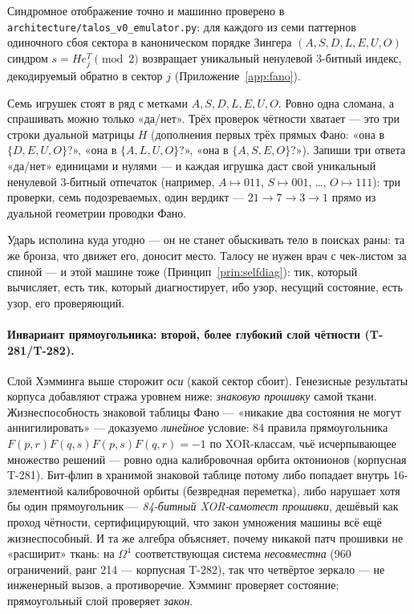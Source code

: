 Синдромное отображение точно и машинно проверено в
\texttt{architecture/talos\_v0\_emulator.py}: для каждого из семи паттернов
одиночного сбоя сектора в каноническом порядке Зингера $(A,S,D,L,E,U,O)$
синдром $s = He_j^T \pmod 2$ возвращает уникальный ненулевой $3$-битный индекс,
декодируемый обратно в сектор $j$ (Приложение~\ref{app:fano}).

\begin{zerobox}
Семь игрушек стоят в ряд с метками $A,S,D,L,E,U,O$. Ровно одна сломана, а
спрашивать можно только «да/нет». Трёх проверок чётности хватает --- это три
строки дуальной матрицы $H$ (дополнения первых трёх прямых Фано: «она в
$\{D,E,U,O\}$?», «она в $\{A,L,U,O\}$?», «она в $\{A,S,E,O\}$?»). Запиши три
ответа «да/нет» единицами и нулями --- и каждая игрушка даст свой уникальный
ненулевой $3$-битный отпечаток (например, $A\mapsto 011$, $S\mapsto 001$, \dots,
$O\mapsto 111$): три проверки, семь подозреваемых, один вердикт ---
$21\to 7\to 3\to 1$ прямо из дуальной геометрии проводки Фано.
\end{zerobox}

\begin{mythbox}
Ударь исполина куда угодно --- он не станет обыскивать тело в поисках раны:
та же бронза, что движет его, доносит место. Талосу не нужен врач с
чек-листом за спиной --- и этой машине тоже
(Принцип~\ref{prin:selfdiag}): тик, который вычисляет, есть тик, который
диагностирует, ибо узор, несущий состояние, есть узор, его проверяющий.
\end{mythbox}

\paragraph{Инвариант прямоугольника: второй, более глубокий слой чётности (T-281/T-282).}
Слой Хэмминга выше сторожит \emph{оси} (какой сектор сбоит). Генезисные
результаты корпуса добавляют стража уровнем ниже: \emph{знаковую прошивку}
самой ткани. Жизнеспособность знаковой таблицы Фано --- «никакие два состояния
не могут аннигилировать» --- доказуемо \emph{линейное} условие: 84 правила
прямоугольника $F(p,r)F(q,s)F(p,s)F(q,r) = -1$ по XOR-классам, чьё
исчерпывающее множество решений --- ровно одна калибровочная орбита октонионов
(корпусная T-281). Бит-флип в хранимой знаковой таблице потому либо попадает
внутрь 16-элементной калибровочной орбиты (безвредная переметка), либо
нарушает хотя бы один прямоугольник --- \emph{84-битный XOR-самотест
прошивки}, дешёвый как проход чётности, сертифицирующий, что закон умножения
машины всё ещё жизнеспособный. И та же алгебра объясняет, почему никакой патч
прошивки не «расширит» ткань: на $\Omega^4$ соответствующая система
\emph{несовместна} (960 ограничений, ранг 214 --- корпусная T-282), так что
четвёртое зеркало --- не инженерный вызов, а противоречие. Хэмминг проверяет
состояние; прямоугольный слой проверяет \emph{закон}.


